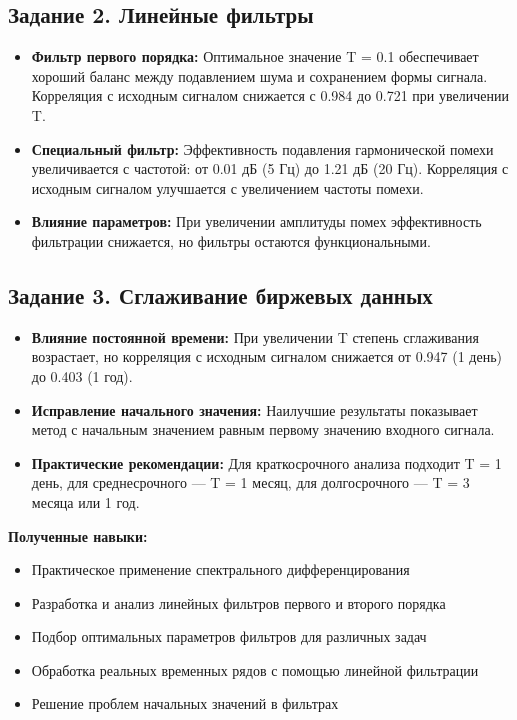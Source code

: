 \subsection*{Задание 2. Линейные фильтры}
\begin{itemize}
    \item \textbf{Фильтр первого порядка:} Оптимальное значение T = 0.1 обеспечивает хороший баланс между подавлением шума и сохранением формы сигнала. Корреляция с исходным сигналом снижается с 0.984 до 0.721 при увеличении T.
    
    \item \textbf{Специальный фильтр:} Эффективность подавления гармонической помехи увеличивается с частотой: от 0.01 дБ (5 Гц) до 1.21 дБ (20 Гц). Корреляция с исходным сигналом улучшается с увеличением частоты помехи.
    
    \item \textbf{Влияние параметров:} При увеличении амплитуды помех эффективность фильтрации снижается, но фильтры остаются функциональными.
\end{itemize}

\subsection*{Задание 3. Сглаживание биржевых данных}
\begin{itemize}
    \item \textbf{Влияние постоянной времени:} При увеличении T степень сглаживания возрастает, но корреляция с исходным сигналом снижается от 0.947 (1 день) до 0.403 (1 год).
    
    \item \textbf{Исправление начального значения:} Наилучшие результаты показывает метод с начальным значением равным первому значению входного сигнала.
    
    \item \textbf{Практические рекомендации:} Для краткосрочного анализа подходит T = 1 день, для среднесрочного — T = 1 месяц, для долгосрочного — T = 3 месяца или 1 год.
\end{itemize}

\textbf{Полученные навыки:}
\begin{itemize}
    \item Практическое применение спектрального дифференцирования
    \item Разработка и анализ линейных фильтров первого и второго порядка
    \item Подбор оптимальных параметров фильтров для различных задач
    \item Обработка реальных временных рядов с помощью линейной фильтрации
    \item Решение проблем начальных значений в фильтрах
\end{itemize}

